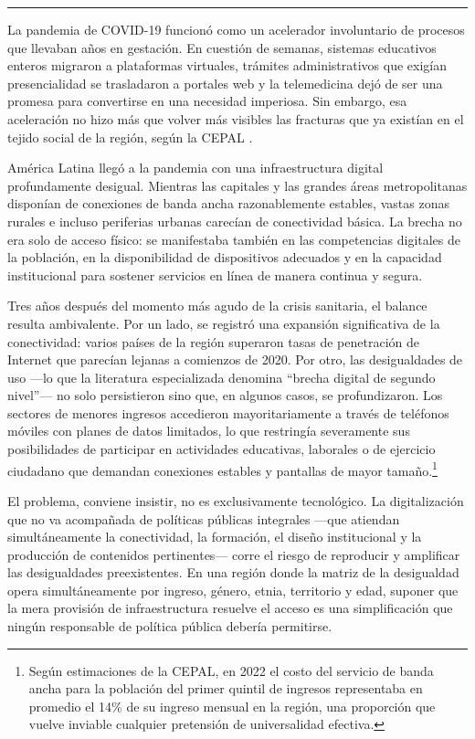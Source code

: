 \bigskip
\noindent\rule{\linewidth}{0.4pt}
\bigskip

La pandemia de COVID-19 funcionó como un acelerador involuntario de procesos que llevaban años en gestación. En cuestión de semanas, sistemas educativos enteros migraron a plataformas virtuales, trámites administrativos que exigían presencialidad se trasladaron a portales web y la telemedicina dejó de ser una promesa para convertirse en una necesidad imperiosa. Sin embargo, esa aceleración no hizo más que volver más visibles las fracturas que ya existían en el tejido social de la región, según la CEPAL \autocite{2566-CEPAL2021}.

América Latina llegó a la pandemia con una infraestructura digital profundamente desigual. Mientras las capitales y las grandes áreas metropolitanas disponían de conexiones de banda ancha razonablemente estables, vastas zonas rurales e incluso periferias urbanas carecían de conectividad básica. La brecha no era solo de acceso físico: se manifestaba también en las competencias digitales de la población, en la disponibilidad de dispositivos adecuados y en la capacidad institucional para sostener servicios en línea de manera continua y segura.

Tres años después del momento más agudo de la crisis sanitaria, el balance resulta ambivalente. Por un lado, se registró una expansión significativa de la conectividad: varios países de la región superaron tasas de penetración de Internet que parecían lejanas a comienzos de 2020. Por otro, las desigualdades de uso —lo que la literatura especializada denomina “brecha digital de segundo nivel”— no solo persistieron sino que, en algunos casos, se profundizaron. Los sectores de menores ingresos accedieron mayoritariamente a través de teléfonos móviles con planes de datos limitados, lo que restringía severamente sus posibilidades de participar en actividades educativas, laborales o de ejercicio ciudadano que demandan conexiones estables y pantallas de mayor tamaño.\footnote{Según estimaciones de la CEPAL, en 2022 el costo del servicio de
banda ancha para la población del primer quintil de ingresos
representaba en promedio el 14\% de su ingreso mensual en la región, una
proporción que vuelve inviable cualquier pretensión de universalidad
efectiva.}

El problema, conviene insistir, no es exclusivamente tecnológico. La digitalización que no va acompañada de políticas públicas integrales —que atiendan simultáneamente la conectividad, la formación, el diseño institucional y la producción de contenidos pertinentes— corre el riesgo de reproducir y amplificar las desigualdades preexistentes. En una región donde la matriz de la desigualdad opera simultáneamente por ingreso, género, etnia, territorio y edad, suponer que la mera provisión de infraestructura resuelve el acceso es una simplificación que ningún responsable de política pública debería permitirse.

